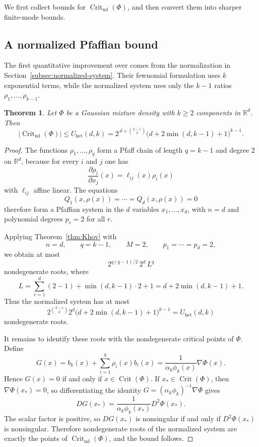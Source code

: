\documentclass[11pt]{article}
\theoremstyle{plain}
\newtheorem{theorem}{Theorem}[section]
\theoremstyle{definition}
\theoremstyle{remark}
\numberwithin{equation}{section}
\DeclareMathOperator{\Crit}{Crit}
\newcommand{\R}{\mathbb{R}}
\begin{document}
We first collect bounds for $\Crit_{\mathrm{nd}}(\Phi)$, and then convert them into sharper finite-mode bounds.

\subsection{A normalized Pfaffian bound}\label{subsec:general-bound}

The first quantitative improvement over \citet{AmendolaEngstromHaase2019} comes from the normalization in Section~\ref{subsec:normalized-system}. Their fewnomial formulation uses $k$ exponential terms, while the normalized system uses only the $k-1$ ratios $\rho_1,\dots,\rho_{k-1}$.

\begin{theorem}\label{thm:main-general}
Let $\Phi$ be a Gaussian mixture density with $k\ge 2$ components in $\R^d$. Then
\[
|\Crit_{\mathrm{nd}}(\Phi)|\le U_{\mathrm{het}}(d,k)=2^{\,d+\binom{k-1}{2}}\bigl(d+2\min(d,k-1)+1\bigr)^{k-1}.
\]
\end{theorem}

\begin{proof}
The functions $\rho_1,\dots,\rho_q$ form a Pfaff chain of length $q=k-1$ and degree $2$ on $\R^d$, because for every $i$ and $j$ one has
\[
\frac{\partial \rho_i}{\partial x_j}(x)=\ell_{ij}(x)\rho_i(x)
\]
with $\ell_{ij}$ affine linear. The equations
\[
Q_1(x,\rho(x))=\cdots=Q_d(x,\rho(x))=0
\]
therefore form a Pfaffian system in the $d$ variables $x_1,\dots,x_d$, with $n=d$ and polynomial degrees $p_r=2$ for all $r$.

Applying Theorem~\ref{thm:Khov} with
\[
n=d,\qquad q=k-1,\qquad M=2,\qquad p_1=\cdots=p_d=2,
\]
we obtain at most
\[
2^{q(q-1)/2}\,2^d\,L^q
\]
nondegenerate roots, where
\[
L=\sum_{r=1}^d(2-1)+\min(d,k-1)\cdot 2+1=d+2\min(d,k-1)+1.
\]
Thus the normalized system has at most
\[
2^{\binom{k-1}{2}}2^d\bigl(d+2\min(d,k-1)+1\bigr)^{k-1}=U_{\mathrm{het}}(d,k)
\]
nondegenerate roots.

It remains to identify these roots with the nondegenerate critical points of $\Phi$. Define
\[
G(x)=b_k(x)+\sum_{i=1}^{q}\rho_i(x)b_i(x)=\frac{1}{\alpha_k\phi_k(x)}\nabla\Phi(x).
\]
Hence $G(x)=0$ if and only if $x\in\Crit(\Phi)$. If $x_\ast\in\Crit(\Phi)$, then $\nabla\Phi(x_\ast)=0$, so differentiating the identity $G=(\alpha_k\phi_k)^{-1}\nabla\Phi$ gives
\[
DG(x_\ast)=\frac{1}{\alpha_k\phi_k(x_\ast)}D^2\Phi(x_\ast).
\]
The scalar factor is positive, so $DG(x_\ast)$ is nonsingular if and only if $D^2\Phi(x_\ast)$ is nonsingular. Therefore nondegenerate roots of the normalized system are exactly the points of $\Crit_{\mathrm{nd}}(\Phi)$, and the bound follows.
\end{proof}
\end{document}
